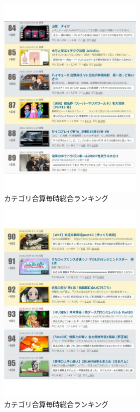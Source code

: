\begin{figure}[htb]
\centering
\includegraphics[width=7cm]{r15.pdf}
\caption{カテゴリ合算毎時総合ランキング}\label{acc}
\end{figure}

\begin{figure}[htb]
\centering
\includegraphics[width=7cm]{r16.pdf}
\caption{カテゴリ合算毎時総合ランキング}\label{acd}
\end{figure}

